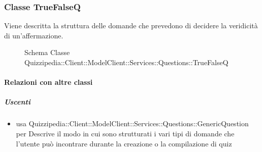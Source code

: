 \subsubsection{Classe TrueFalseQ}
Viene descritta la struttura delle domande che prevedono di decidere la veridicità di un'affermazione.
\begin{figure}[H]
\centering
\noindent{}
\caption[Schema Classe TrueFalseQ]{Schema Classe Quizzipedia::Client::ModelClient::Services::Questions::TrueFalseQ}
\end{figure}
\paragraph{Relazioni con altre classi}
\subparagraph{Uscenti}
\begin{itemize}
\item usa Quizzipedia::Client::ModelClient::Services::Questions::GenericQuestion per Descrive il modo in cui sono strutturati i vari tipi di domande che l'utente può incontrare durante la creazione o la compilazione di quiz
\end{itemize}
